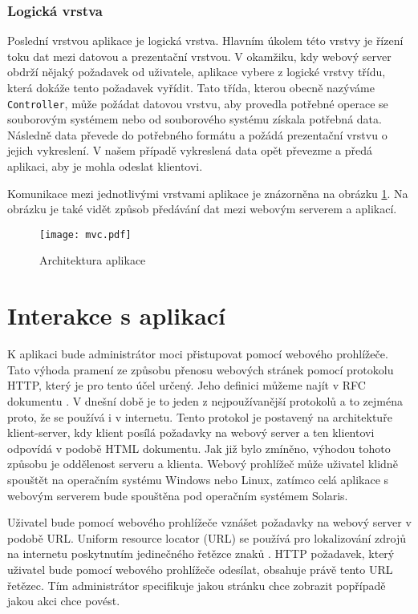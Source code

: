         \subsubsection{Logická vrstva}
        Poslední vrstvou aplikace je logická vrstva. Hlavním úkolem této vrstvy je řízení toku dat mezi datovou a prezentační vrstvou. V okamžiku, kdy webový server obdrží nějaký požadavek od uživatele, aplikace vybere z logické vrstvy třídu, která dokáže tento požadavek vyřídit. Tato třída, kterou obecně nazýváme \verb|Controller|, může požádat datovou vrstvu, aby provedla potřebné operace se souborovým systémem nebo od souborového systému získala potřebná data. Následně data převede do potřebného formátu a požádá prezentační vrstvu o jejich vykreslení. V našem případě vykreslená data opět převezme a předá aplikaci, aby je mohla odeslat klientovi.

        Komunikace mezi jednotlivými vrstvami aplikace je znázorněna na obrázku \ref{mvc}. Na obrázku je také vidět způsob předávání dat mezi webovým serverem a aplikací.

    \begin{figure}[h]
        \caption{Architektura aplikace}
        \label{mvc}
        \centering
        \texttt{[image: mvc.pdf]}
    \end{figure}
\section{Interakce s aplikací}
K aplikaci bude administrátor moci přistupovat pomocí webového prohlížeče. Tato výhoda pramení ze způsobu přenosu webových stránek pomocí protokolu HTTP, který je pro tento účel určený. Jeho definici můžeme najít v RFC dokumentu \cite{RFC2616}. V dnešní době je to jeden z nejpoužívanější protokolů a to zejména proto, že se používá i v internetu. Tento protokol je postavený na architektuře klient-server, kdy klient posílá požadavky na webový server a ten klientovi odpovídá v podobě HTML dokumentu. Jak již bylo zmíněno, výhodou tohoto způsobu je oddělenost serveru a klienta. Webový prohlížeč může uživatel klidně spouštět na operačním systému Windows nebo Linux, zatímco celá aplikace s webovým serverem bude spouštěna pod operačním systémem Solaris.

Uživatel bude pomocí webového prohlížeče vznášet požadavky na webový server v podobě URL. Uniform resource locator (URL) se používá pro lokalizování zdrojů na internetu poskytnutím jedinečného řetězce znaků \cite{RFC3986}. HTTP požadavek, který uživatel bude pomocí webového prohlížeče odesílat, obsahuje právě tento URL řetězec. Tím administrátor specifikuje jakou stránku chce zobrazit popřípadě jakou akci chce povést.

